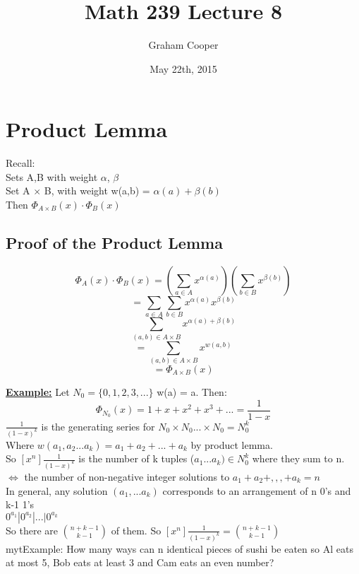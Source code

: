 \documentclass[12pt]{article}
\title{\vspace{-15ex}Math 239 Lecture 8\vspace{-1ex}}
\date{May 22th, 2015}
\author{Graham Cooper}
\newcommand{\myt}[1]{\textbf{\underline{#1}}}
\begin{document}
	\maketitle
	
	\section*{Product Lemma}
	Recall:\\
	
	Sets A,B with weight $\alpha$, $\beta$\\
	Set A $\times$ B, with weight w(a,b) = $\alpha(a) + \beta(b)$\\
	Then $\Phi_{A\times B}(x) \cdot \Phi_B(x)$\\
	
	\subsection*{Proof of the Product Lemma}
	$$\Phi_A(x) \cdot \Phi_B(x) = (\sum_{a \in A}x^{\alpha(a)})(\sum_{b \in B}x^{\beta(b)})$$
	$$= \sum_{a \in A}\sum_{b \in B}x^{\alpha(a)}x^{\beta(b)}$$
	$$\sum_{(a,b) \in A \times B}x^{\alpha(a) + \beta(b)}$$
	$$= \sum_{(a,b) \in A \times B}x^{w(a,b)}$$
	$$= \Phi_{A\times B}(x)$$
	
	\myt{Example:} Let $N_0 = \{0,1,2,3,...\}$ w(a) = a. Then:\\
	
	$$\Phi_{N_0}(x) = 1 + x + x^2 + x^3 + ... = \frac{1}{1-x}$$
	$\frac{1}{(1-x)^k}$ is the generating series for $N_0 \times N_0 ... \times N_0 = N_0^k$\\
	Where $w(a_1,a_2...a_k) = a_1 + a_2 + ... + a_k$ by product lemma.\\
	
	So $[x^n]\frac{1}{(1-x)^k}$ is the number of k tuples ($a_1...a_k) \in N_0^k$ where they sum to n.\\
	$\iff$ the number of non-negative integer solutions to $a_1 + a_2 + ,,, + a_k = n$\\
	
	In general, any solution $(a_1, ... a_k)$ corresponds to an arrangement of n 0's and k-1 1's\\
	$0^{a_1} | 0^{a_2} | ... | 0^{a_k}$\\
	So there are ${n+k-1 \choose k-1}$ of them. So $[x^n]\frac{1}{(1-x)^k} = {n+k-1 \choose k-1}$\\
	
	myt{Example:} How many ways can n identical pieces of sushi be eaten so Al eats at most 5, Bob eats at least 3 and Cam eats an even number?\\
	
\end{document}
